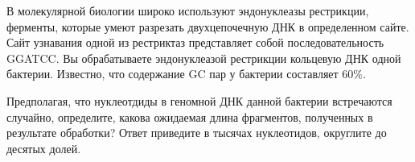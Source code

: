 
В молекулярной биологии широко используют
эндонуклеазы рестрикции, ферменты, которые умеют разрезать двухцепочечную ДНК в
определенном сайте. Сайт узнавания одной из рестриктаз представляет собой
последовательность GGATCC. Вы обрабатываете эндонуклеазой рестрикции кольцевую
ДНК одной бактерии. Известно, что содержание GC пар у бактерии составляет $60\%$.


Предполагая, что нуклеотдиды в геномной ДНК данной бактерии встречаются случайно, определите, какова ожидаемая длина фрагментов, полученных в результате обработки? Ответ
приведите в тысячах нуклеотидов, 
округлите до десятых долей.

\explanationSection

